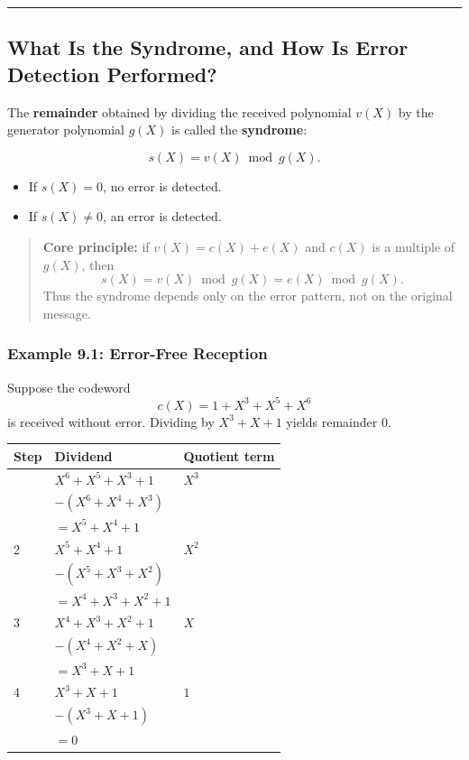 \documentclass[
]{article}
\providecommand{\tightlist}{%
  \setlength{\itemsep}{0pt}\setlength{\parskip}{0pt}}
\begin{document}
\begin{center}\rule{0.5\linewidth}{0.5pt}\end{center}

\subsection{What Is the Syndrome, and How Is Error Detection
Performed?}\label{what-is-the-syndrome-and-how-is-error-detection-performed}

The \textbf{remainder} obtained by dividing the received polynomial
\(v(X)\) by the generator polynomial \(g(X)\) is called the
\textbf{syndrome}:

\[s(X)=v(X) \bmod g(X).\]

\begin{itemize}
\tightlist
\item
  If \(s(X)=0\), no error is detected.
\item
  If \(s(X)\neq 0\), an error is detected.
\end{itemize}

\begin{quote}
\textbf{Core principle:} if \(v(X)=c(X)+e(X)\) and \(c(X)\) is a
multiple of \(g(X)\), then \[s(X)=v(X) \bmod g(X)=e(X) \bmod g(X).\]
Thus the syndrome depends only on the error pattern, not on the original
message.
\end{quote}

\subsubsection{Example 9.1: Error-Free
Reception}\label{example-9.1-error-free-reception}

Suppose the codeword \[c(X)=1+X^3+X^5+X^6\] is received without error.
Dividing by \(X^3+X+1\) yields remainder 0.

\begin{longtable}[]{@{}lll@{}}
\toprule\noalign{}
Step & Dividend & Quotient term \\
\midrule\noalign{}
\endhead
\bottomrule\noalign{}
\endlastfoot
1 & \(X^6 + X^5 + X^3 + 1\) & \(X^3\) \\
& \(-(X^6 + X^4 + X^3)\) & \\
& \(= X^5 + X^4 + 1\) & \\
2 & \(X^5 + X^4 + 1\) & \(X^2\) \\
& \(-(X^5 + X^3 + X^2)\) & \\
& \(= X^4 + X^3 + X^2 + 1\) & \\
3 & \(X^4 + X^3 + X^2 + 1\) & \(X\) \\
& \(-(X^4 + X^2 + X)\) & \\
& \(= X^3 + X + 1\) & \\
4 & \(X^3 + X + 1\) & \(1\) \\
& \(-(X^3 + X + 1)\) & \\
& \(= 0\) & \\
\end{longtable}
\end{document}
